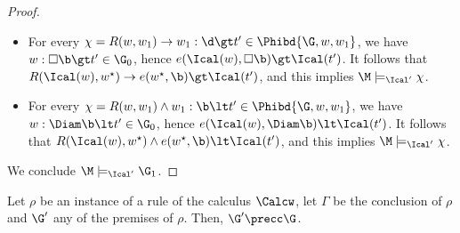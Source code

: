 \begin{proof}
\begin{itemize}
  \item For every $\chi=R(w,w_1)\to w_1 : \d \gt
    t'\in\Phibd{\G,w,w_1}$, we have $w : \Box \b \gt t'\in \G_0$,
    hence $e(\Ical(w),\Box \b) \gt \Ical(t')$.  %
    It follows that $R(\Ical(w),w^\star)\to e(w^\star,\b)\gt
    \Ical(t')$, and this implies $\M\models_{\Ical'} \chi$.

  \item For every $\chi=R(w,w_1)\wedge w_1 : \b \lt
    t'\in\Phibd{\G,w,w_1}$, we have $w : \Diam \b \lt t'\in \G_0$,
    hence $e(\Ical(w),\Diam \b) \lt
    \Ical(t')$. %
    It follows that $R(\Ical(w),w^\star)\land
    e(w^\star,\b)\lt\Ical(t')$, and this implies $\M\models_{\Ical'}
    \chi$.
  \end{itemize}
  We conclude $\M\models_{\Ical'} \G_1$.  
\end{proof}
  
  
\begin{lemma}\label{lemma:rulesDec}
  Let $\rho$ be an instance of a rule of the calculus $\Calcw$, let
  $\Gamma$ be the conclusion of $\rho$ and  $\G'$ any of the premises of $\rho$.
  Then,  $\G'\precc \G$.
\end{lemma}

